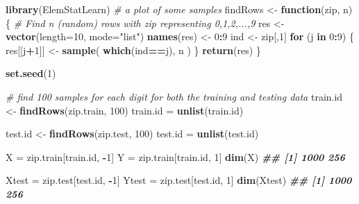 \documentclass[
]{book}
\newenvironment{Shaded}{\begin{snugshade}}{\end{snugshade}}
\newcommand{\AttributeTok}[1]{\textcolor[rgb]{0.13,0.29,0.53}{#1}}
\newcommand{\CommentTok}[1]{\textcolor[rgb]{0.56,0.35,0.01}{\textit{#1}}}
\newcommand{\ControlFlowTok}[1]{\textcolor[rgb]{0.13,0.29,0.53}{\textbf{#1}}}
\newcommand{\DecValTok}[1]{\textcolor[rgb]{0.00,0.00,0.81}{#1}}
\newcommand{\DocumentationTok}[1]{\textcolor[rgb]{0.56,0.35,0.01}{\textbf{\textit{#1}}}}
\newcommand{\FunctionTok}[1]{\textcolor[rgb]{0.13,0.29,0.53}{\textbf{#1}}}
\newcommand{\NormalTok}[1]{#1}
\newcommand{\OtherTok}[1]{\textcolor[rgb]{0.56,0.35,0.01}{#1}}
\newcommand{\SpecialCharTok}[1]{\textcolor[rgb]{0.81,0.36,0.00}{\textbf{#1}}}
\newcommand{\StringTok}[1]{\textcolor[rgb]{0.31,0.60,0.02}{#1}}
\theoremstyle{definition}
\theoremstyle{definition}
\theoremstyle{definition}
\theoremstyle{definition}
\theoremstyle{remark}
\begin{document}
\begin{Shaded}
\begin{Highlighting}[]
    \FunctionTok{library}\NormalTok{(ElemStatLearn)}
    \CommentTok{\# a plot of some samples }
\NormalTok{    findRows }\OtherTok{\textless{}{-}} \ControlFlowTok{function}\NormalTok{(zip, n) \{}
        \CommentTok{\# Find n (random) rows with zip representing 0,1,2,...,9}
\NormalTok{        res }\OtherTok{\textless{}{-}} \FunctionTok{vector}\NormalTok{(}\AttributeTok{length=}\DecValTok{10}\NormalTok{, }\AttributeTok{mode=}\StringTok{"list"}\NormalTok{)}
        \FunctionTok{names}\NormalTok{(res) }\OtherTok{\textless{}{-}} \DecValTok{0}\SpecialCharTok{:}\DecValTok{9}
\NormalTok{        ind }\OtherTok{\textless{}{-}}\NormalTok{ zip[,}\DecValTok{1}\NormalTok{]}
        \ControlFlowTok{for}\NormalTok{ (j }\ControlFlowTok{in} \DecValTok{0}\SpecialCharTok{:}\DecValTok{9}\NormalTok{) \{}
\NormalTok{        res[[j}\SpecialCharTok{+}\DecValTok{1}\NormalTok{]] }\OtherTok{\textless{}{-}} \FunctionTok{sample}\NormalTok{( }\FunctionTok{which}\NormalTok{(ind}\SpecialCharTok{==}\NormalTok{j), n ) \}}
        \FunctionTok{return}\NormalTok{(res) }
\NormalTok{    \}}
    
    \FunctionTok{set.seed}\NormalTok{(}\DecValTok{1}\NormalTok{)}
    
    \CommentTok{\# find 100 samples for each digit for both the training and testing data}
\NormalTok{    train.id }\OtherTok{\textless{}{-}} \FunctionTok{findRows}\NormalTok{(zip.train, }\DecValTok{100}\NormalTok{)}
\NormalTok{    train.id }\OtherTok{=} \FunctionTok{unlist}\NormalTok{(train.id)}
    
\NormalTok{    test.id }\OtherTok{\textless{}{-}} \FunctionTok{findRows}\NormalTok{(zip.test, }\DecValTok{100}\NormalTok{)}
\NormalTok{    test.id }\OtherTok{=} \FunctionTok{unlist}\NormalTok{(test.id)}
    
\NormalTok{    X }\OtherTok{=}\NormalTok{ zip.train[train.id, }\SpecialCharTok{{-}}\DecValTok{1}\NormalTok{]}
\NormalTok{    Y }\OtherTok{=}\NormalTok{ zip.train[train.id, }\DecValTok{1}\NormalTok{]}
    \FunctionTok{dim}\NormalTok{(X)}
\DocumentationTok{\#\# [1] 1000  256}
    
\NormalTok{    Xtest }\OtherTok{=}\NormalTok{ zip.test[test.id, }\SpecialCharTok{{-}}\DecValTok{1}\NormalTok{]}
\NormalTok{    Ytest }\OtherTok{=}\NormalTok{ zip.test[test.id, }\DecValTok{1}\NormalTok{]}
    \FunctionTok{dim}\NormalTok{(Xtest)}
\DocumentationTok{\#\# [1] 1000  256}
\end{Highlighting}
\end{Shaded}
\end{document}
